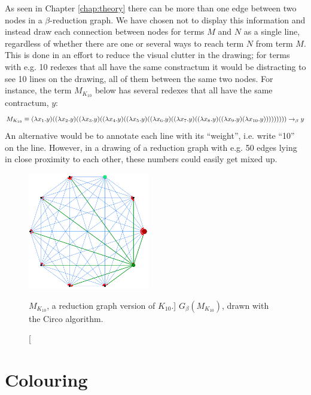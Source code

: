 As seen in Chapter \ref{chap:theory} there can be more than one edge between
two nodes in a $\beta$-reduction graph. We have chosen not to display this
information and instead draw each connection between nodes for terms $M$ and
$N$ as a single line, regardless of whether there are one or several ways to
reach term $N$ from term $M$. This is done in an effort to reduce the visual
clutter in the drawing; for terms with e.g. 10 redexes that all have the same
constractum it would be distracting to see 10 lines on the drawing, all of
them between the same two nodes. For instance, the term $M_{K_{10}}$ below has
several redexes that all have the same contractum, $y$:
\begin{equation*}
	M_{K_{10}} \equiv
	(\lambda x_1.y) 
	((\lambda x_2.y) 
	((\lambda x_3.y) 
	((\lambda x_4.y) 
	((\lambda x_5.y) 
	((\lambda x_6.y)
	((\lambda x_7.y)
	((\lambda x_8.y)
	((\lambda x_9.y)
	(\lambda x_{10}.y))))))))) \rightarrow_\beta y
\end{equation*}
An alternative would be to annotate each line with its ``weight'', i.e. write
``10'' on the line. However, in a drawing of a reduction graph with e.g. 50
edges lying in close proximity to each other, these numbers could easily get
mixed up.
\begin{figure}[htbp]
	\centering
		\includegraphics[height=2in]{../images/lambda_k10_CIRCO.png}
	\caption
	[$M_{K_{10}}$, a reduction graph version of $K_{10}$.]
	{$G_\beta(M_{K_{10}})$, drawn with the Circo algorithm.}
	\label{fig:images_lambda_k10_CIRCO}
\end{figure}

\section{Colouring}

